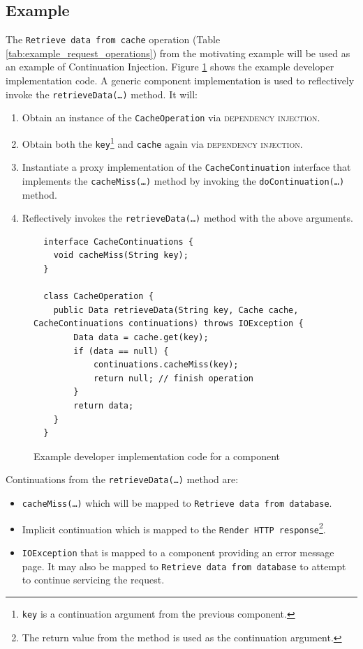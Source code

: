 \documentclass[prodmode]{style/acmlarge}
\begin{document}
\subsection{Example}

The \texttt{Retrieve data from cache} operation (Table
\ref{tab:example_request_operations}) from the motivating example will be used
as an example of Continuation Injection.  Figure
\ref{fig:Example_Method_Operation} shows the example developer implementation
code.  A generic component implementation is used to reflectively invoke the
\texttt{retrieveData(\ldots)} method. It will:
\begin{enumerate}
  \item Obtain an instance of the \texttt{CacheOperation} via \textsc{dependency injection}.
  \item Obtain both the \texttt{key}\footnote{\texttt{key} is a continuation argument from the previous component.} and \texttt{cache} again via \textsc{dependency injection}.
  \item Instantiate a proxy implementation of the \texttt{CacheContinuation} interface that implements the \texttt{cacheMiss(\ldots)} method by invoking the \texttt{doContinuation(\ldots)} method. 
  \item Reflectively invokes the \texttt{retrieveData(\ldots)} method with the above arguments.
\end{enumerate}

\begin{figure}[tp]
\centering
\begin{verbatim}
  interface CacheContinuations {
    void cacheMiss(String key);
  }

  class CacheOperation {    
    public Data retrieveData(String key, Cache cache, CacheContinuations continuations) throws IOException {
        Data data = cache.get(key);
        if (data == null) {
            continuations.cacheMiss(key);
            return null; // finish operation
        }
        return data;
    }
  }
\end{verbatim}
\caption{Example developer implementation code for a component\footnotemark}
\label{fig:Example_Method_Operation}
\end{figure}

Continuations from the \texttt{retrieveData(\ldots)} method are:
\begin{itemize}
  \item \texttt{cacheMiss(\ldots)} which will be mapped to \texttt{Retrieve data from database}.
  \item Implicit continuation which is mapped to the \texttt{Render HTTP response}\footnote{The return value from the method is used as the continuation argument.}.
  \item \texttt{IOException} that is mapped to a component providing an error message page.  It may also be mapped to \texttt{Retrieve data from database} to attempt to continue servicing the request.
\end{itemize}
\end{document}
